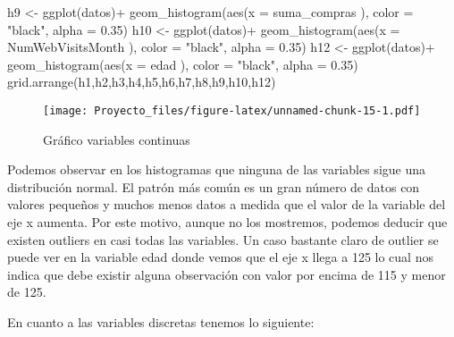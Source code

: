 \documentclass[
]{article}
\newenvironment{Shaded}{\begin{snugshade}}{\end{snugshade}}
\newcommand{\AttributeTok}[1]{\textcolor[rgb]{0.77,0.63,0.00}{#1}}
\newcommand{\FloatTok}[1]{\textcolor[rgb]{0.00,0.00,0.81}{#1}}
\newcommand{\FunctionTok}[1]{\textcolor[rgb]{0.00,0.00,0.00}{#1}}
\newcommand{\NormalTok}[1]{#1}
\newcommand{\OtherTok}[1]{\textcolor[rgb]{0.56,0.35,0.01}{#1}}
\newcommand{\SpecialCharTok}[1]{\textcolor[rgb]{0.00,0.00,0.00}{#1}}
\newcommand{\StringTok}[1]{\textcolor[rgb]{0.31,0.60,0.02}{#1}}
\begin{document}
\begin{Shaded}
\begin{Highlighting}[]
\NormalTok{h9 }\OtherTok{\textless{}{-}} \FunctionTok{ggplot}\NormalTok{(datos)}\SpecialCharTok{+}
  \FunctionTok{geom\_histogram}\NormalTok{(}\FunctionTok{aes}\NormalTok{(}\AttributeTok{x =}\NormalTok{ suma\_compras ), }\AttributeTok{color =} \StringTok{"black"}\NormalTok{, }\AttributeTok{alpha =} \FloatTok{0.35}\NormalTok{)}
\NormalTok{h10 }\OtherTok{\textless{}{-}} \FunctionTok{ggplot}\NormalTok{(datos)}\SpecialCharTok{+}
  \FunctionTok{geom\_histogram}\NormalTok{(}\FunctionTok{aes}\NormalTok{(}\AttributeTok{x =}\NormalTok{ NumWebVisitsMonth ), }\AttributeTok{color =} \StringTok{"black"}\NormalTok{, }\AttributeTok{alpha =} \FloatTok{0.35}\NormalTok{)}
\NormalTok{h12 }\OtherTok{\textless{}{-}} \FunctionTok{ggplot}\NormalTok{(datos)}\SpecialCharTok{+}
  \FunctionTok{geom\_histogram}\NormalTok{(}\FunctionTok{aes}\NormalTok{(}\AttributeTok{x =}\NormalTok{ edad ), }\AttributeTok{color =} \StringTok{"black"}\NormalTok{, }\AttributeTok{alpha =} \FloatTok{0.35}\NormalTok{)}
\FunctionTok{grid.arrange}\NormalTok{(h1,h2,h3,h4,h5,h6,h7,h8,h9,h10,h12)}
\end{Highlighting}
\end{Shaded}

\begin{figure}
\centering
\texttt{[image: Proyecto\_files/figure-latex/unnamed-chunk-15-1.pdf]}
\caption{Gráfico variables continuas}
\end{figure}

Podemos observar en los histogramas que ninguna de las variables sigue
una distribución normal. El patrón más común es un gran número de datos
con valores pequeños y muchos menos datos a medida que el valor de la
variable del eje x aumenta. Por este motivo, aunque no los mostremos,
podemos deducir que existen outliers en casi todas las variables. Un
caso bastante claro de outlier se puede ver en la variable edad donde
vemos que el eje x llega a 125 lo cual nos indica que debe existir
alguna observación con valor por encima de 115 y menor de 125.

En cuanto a las variables discretas tenemos lo siguiente:
\end{document}
